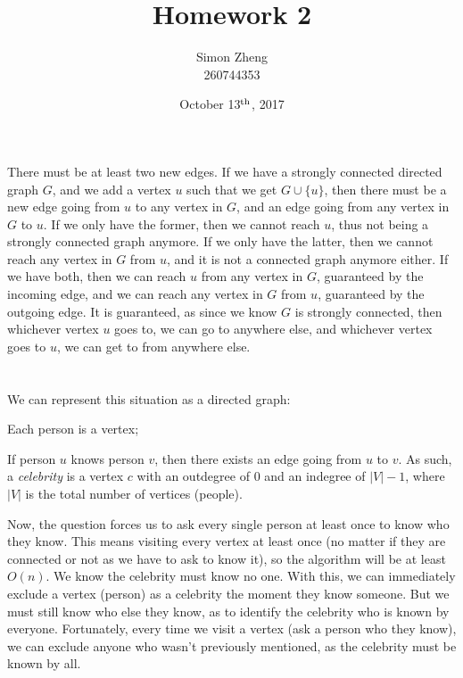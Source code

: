 \documentclass[11pt,letterpaper]{article}
\author{Simon Zheng\\260744353}
\title{Homework 2}
\date{October 13$^{\textnormal{th}}$, 2017}
\begin{document}
	\maketitle
	\thispagestyle{fancy}
	
	\section{}
		There must be at least two new edges. If we have a strongly connected directed graph $G$, and we add a vertex $u$ such that we get $G \cup \{u\}$, then there must be a new edge going from $u$ to any vertex in $G$, and an edge going from any vertex in $G$ to $u$. If we only have the former, then we cannot reach $u$, thus not being a strongly connected graph anymore. If we only have the latter, then we cannot reach any vertex in $G$ from $u$, and it is not a connected graph anymore either. If we have both, then we can reach $u$ from any vertex in $G$, guaranteed by the incoming edge, and we can reach any vertex in $G$ from $u$, guaranteed by the outgoing edge. It is guaranteed, as since we know $G$ is strongly connected, then whichever vertex $u$ goes to, we can go to anywhere else, and whichever vertex goes to $u$, we can get to from anywhere else.
	
	\section{}
		We can represent this situation as a directed graph:
		
		Each person is a vertex;
		
		If person $u$ knows person $v$, then there exists an edge going from $u$ to $v$.\newline
		As such, a \textit{celebrity} is a vertex $c$ with an outdegree of $0$ and an indegree of $|V| - 1$, where $|V|$ is the total number of vertices (people).
		
		Now, the question forces us to ask every single person at least once to know who they know. This means visiting every vertex at least once (no matter if they are connected or not as we have to ask to know it), so the algorithm will be at least $O(n)$.
		We know the celebrity must know no one. With this, we can immediately exclude a vertex (person) as a celebrity the moment they know someone. But we must still know who else they know, as to identify the celebrity who is known by everyone.
		Fortunately, every time we visit a vertex (ask a person who they know), we can exclude anyone who wasn't previously mentioned, as the celebrity must be known by all.
		
\end{document}
